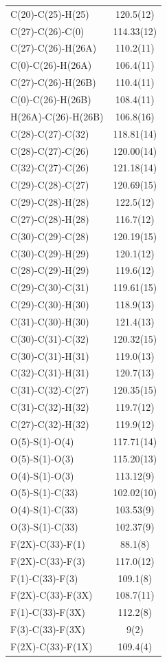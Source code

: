 \begin{center}
{\begin{supertabular}{p{1.5in}c}
C(20)-C(25)-H(25)&120.5(12)\\
C(27)-C(26)-C(0)&114.33(12)\\
C(27)-C(26)-H(26A)&110.2(11)\\
C(0)-C(26)-H(26A)&106.4(11)\\
C(27)-C(26)-H(26B)&110.4(11)\\
C(0)-C(26)-H(26B)&108.4(11)\\
H(26A)-C(26)-H(26B)&106.8(16)\\
C(28)-C(27)-C(32)&118.81(14)\\
C(28)-C(27)-C(26)&120.00(14)\\
C(32)-C(27)-C(26)&121.18(14)\\
C(29)-C(28)-C(27)&120.69(15)\\
C(29)-C(28)-H(28)&122.5(12)\\
C(27)-C(28)-H(28)&116.7(12)\\
C(30)-C(29)-C(28)&120.19(15)\\
C(30)-C(29)-H(29)&120.1(12)\\
C(28)-C(29)-H(29)&119.6(12)\\
C(29)-C(30)-C(31)&119.61(15)\\
C(29)-C(30)-H(30)&118.9(13)\\
C(31)-C(30)-H(30)&121.4(13)\\
C(30)-C(31)-C(32)&120.32(15)\\
C(30)-C(31)-H(31)&119.0(13)\\
C(32)-C(31)-H(31)&120.7(13)\\
C(31)-C(32)-C(27)&120.35(15)\\
C(31)-C(32)-H(32)&119.7(12)\\
C(27)-C(32)-H(32)&119.9(12)\\
O(5)-S(1)-O(4)&117.71(14)\\
O(5)-S(1)-O(3)&115.20(13)\\
O(4)-S(1)-O(3)&113.12(9)\\
O(5)-S(1)-C(33)&102.02(10)\\
O(4)-S(1)-C(33)&103.53(9)\\
O(3)-S(1)-C(33)&102.37(9)\\
F(2X)-C(33)-F(1)&88.1(8)\\
F(2X)-C(33)-F(3)&117.0(12)\\
F(1)-C(33)-F(3)&109.1(8)\\
F(2X)-C(33)-F(3X)&108.7(11)\\
F(1)-C(33)-F(3X)&112.2(8)\\
F(3)-C(33)-F(3X)&9(2)\\
F(2X)-C(33)-F(1X)&109.4(4)\\

\end{supertabular}}
\end{center}
